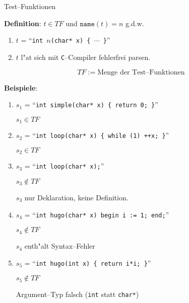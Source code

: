 \documentclass{slides}
\begin{document}
\begin{center}
   Test--Funktionen 
\end{center}
\vspace*{0.5cm}

\footnotesize
\textbf{Definition}: $t \in T\!F$ und $\mathtt{name}(t) = n$ g.d.w. 
\begin{enumerate}
\item $t$ = ``{\tt int $n$(char* x) \{ $\cdots$ \}}''
\item $t$ l"a\3t sich mit \texttt{C}--Compiler fehlerfrei parsen.
\end{enumerate}
$$   T\!F := \mbox{Menge der Test--Funktionen}    $$

\textbf{Beispiele}:  
\begin{enumerate}
\item $s_1$ = ``{\tt int simple(char* x) \{ return 0; \}}''

      $s_1 \in T\!F$
\item $s_2$ = ``{\tt int loop(char* x) \{ while (1) ++x; \}}''

      $s_2 \in T\!F$ 
\item $s_3$ = ``{\tt int loop(char* x);}''

      $s_3 \not\in T\!F$ 
      
      $s_3$ nur Deklaration,  keine Definition.
\item $s_4$ = ``{\tt int hugo(char* x) begin i := 1; end;}''

      $s_4 \not\in T\!F$ 

      $s_4$ enth"alt Syntax--Fehler
\item $s_5$ = ``{\tt int hugo(int x) \{ return i*i; \}}''

      $s_5 \not\in T\!F$ 

      Argument--Typ falsch (\texttt{int} statt \texttt{char*})
\end{enumerate}
\end{document}

